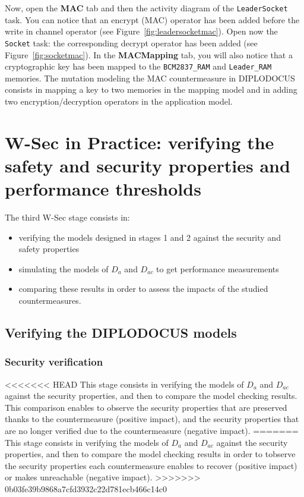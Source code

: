\documentclass{article}
\begin{document}
Now, open the \textbf{MAC} tab and then the activity diagram of the \texttt{LeaderSocket} task. You can notice that an encrypt (MAC) operator has been added before the write in channel operator (see Figure~\ref{fig:leadersocketmac}). Open now the \texttt{Socket} task: the corresponding decrypt operator has been added (see Figure~\ref{fig:socketmac}). In the \textbf{MACMapping} tab, you will also notice that a cryptographic key has been mapped to the \texttt{BCM2837\_RAM} and \texttt{Leader\_RAM} memories. The mutation modeling the MAC countermeasure in DIPLODOCUS consists in mapping a key to two memories in the mapping model and in adding two encryption/decryption operators in the application model.


\section{W-Sec in Practice: verifying the safety and security properties and performance thresholds}

The third W-Sec stage consists in:
\begin{itemize}
	\item verifying the models designed in stages 1 and 2 against the security and safety properties
	\item simulating the models of $D_a$ and $D_{a c}$ to get performance measurements
	\item comparing these results in order to assess the impacts of the studied countermeasures.
\end{itemize}

\subsection{Verifying the DIPLODOCUS models}

\subsubsection{Security verification}

<<<<<<< HEAD
This stage consists in verifying the models of $D_a$ and $D_{a c}$ against the security properties, and then to compare the model checking results. This comparison enables to observe the security properties that are preserved thanks to the countermeasure (positive impact), and the security properties that are no longer verified due to the countermeasure (negative impact).
=======
This stage consists in verifying the models of $D_a$ and $D_{a c}$ against the security properties, and then to compare the model checking results in order to tobserve the security properties each countermeasure enables to recover (positive impact) or makes unreachable (negative impact).
>>>>>>> 0b03fe39b9868a7cfd3932c22d781ecb466c14c0
\end{document}
